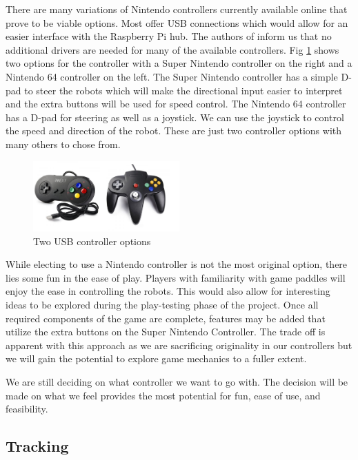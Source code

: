 \documentclass[11pt]{ieeeconf}
\begin{document}
There are many variations of Nintendo controllers currently available online that prove to be viable options. Most offer USB connections which would allow for an easier interface with the Raspberry Pi hub. The authors of \cite{controller:19} inform us that no additional drivers are needed for many of the available controllers. Fig \ref{Controllers} shows two options for the controller with a Super Nintendo controller on the right and a Nintendo 64 controller on the left. The Super Nintendo controller has a simple D-pad to steer the robots which will make the directional input easier to interpret and the extra buttons will be used for speed control. The Nintendo 64 controller has a D-pad for steering as well as a joystick. We can use the joystick to control the speed and direction of the robot. These are just two controller options with many others to chose from. 

\begin{figure}[H]
\centering
\captionsetup{justification=centering}
\includegraphics[width=0.5\textwidth]{images/controllers.png}
\caption{Two USB controller options \cite{controller:19}}
\label{Controllers}
\end{figure}

While electing to use a Nintendo controller is not the most original option, there lies some fun in the ease of play. Players with familiarity with game paddles will enjoy the ease in controlling the robots. This would also allow for interesting ideas to be explored during the play-testing phase of the project. Once all required components of the game are complete, features may be added that utilize the extra buttons on the Super Nintendo Controller. The trade off is apparent with this approach as we are sacrificing originality in our controllers but we will gain the potential to explore game mechanics to a fuller extent. 

We are still deciding on what controller we want to go with. The decision will be made on what we feel provides the most potential for fun, ease of use, and feasibility.  

\subsection{Tracking}
\end{document}
